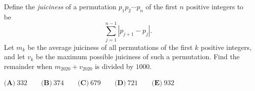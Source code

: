 Define the \emph{juiciness} of a permutation $p_1p_2\cdots p_n$ of the first $n$ positive integers to be
\[\sum_{j=1}^{n-1}\left|p_{j+1}-p_j\right| .\]
Let $m_k$ be the average juiciness of all permutations of the first $k$ positive integers, and let $v_k$ be the maximum possible juiciness of such a permutation. Find the remainder when $m_{2020}+v_{2020}$ is divided by $1000$.

$\textbf{(A)}\ 332 \qquad\textbf{(B)}\ 374 \qquad\textbf{(C)}\ 679 \qquad\textbf{(D)}\ 721 \qquad\textbf{(E)}\ 932$
